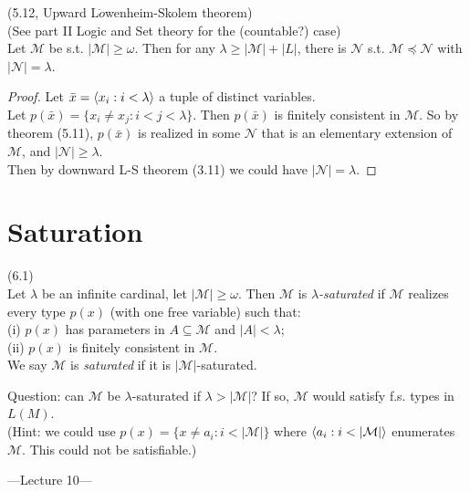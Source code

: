 \documentclass[a4paper]{article}
\begin{document}
\begin{thm} (5.12, Upward L$\ddot{o}$wenheim-Skolem theorem)\\
    (See part II Logic and Set theory for the (countable?) case)\\
    Let $\mathcal{M}$ be s.t. $|\mathcal{M}| \geq \omega$. Then for any $\lambda \geq |\mathcal{M}| + |L|$, there is $\mathcal{N}$ s.t. $\mathcal{M} \preccurlyeq \mathcal{N}$ with $|\mathcal{N}| = \lambda$.
    \begin{proof}
        Let $\bar{x} = \langle x_i: i < \lambda \rangle$ a tuple of distinct variables.\\
        Let $p(\bar{x}) = \{x_i \neq x_j: i < j < \lambda\}$. Then $p(\bar{x})$ is finitely consistent in $\mathcal{M}$. So by theorem (5.11), $p(\bar{x})$ is realized in some $\mathcal{N}$ that is an elementary extension of $\mathcal{M}$, and $|\mathcal{N}| \geq \lambda$.\\
        Then by downward L-S theorem (3.11) we could have $|\mathcal{N}| = \lambda$.
    \end{proof}
\end{thm}

\newpage

\section{Saturation}

\begin{defi} (6.1)\\
    Let $\lambda$ be an infinite cardinal, let $|\mathcal{M}| \geq \omega$. Then $\mathcal{M}$ is \emph{$\lambda$-saturated} if $\mathcal{M}$ realizes every type $p(x)$ (with one free variable) such that:\\
    (i) $p(x)$ has parameters in $A \subseteq \mathcal{M}$ and $|A| < \lambda$;\\
    (ii) $p(x)$ is finitely consistent in $\mathcal{M}$.\\
    We say $\mathcal{M}$ is \emph{saturated} if it is $|\mathcal{M}|$-saturated.
\end{defi}

Question: can $\mathcal{M}$ be $\lambda$-saturated if $\lambda > |\mathcal{M}|$? If so, $\mathcal{M}$ would satisfy f.s. types in $L(M)$.\\
(Hint: we could use $p(x) = \{x \neq a_i: i < |\mathcal{M}|\}$ where $\bra a_i: i<|\mathcal{M}| \ket$ enumerates $\mathcal{M}$. This could not be satisfiable.)

---Lecture 10---
\end{document}
